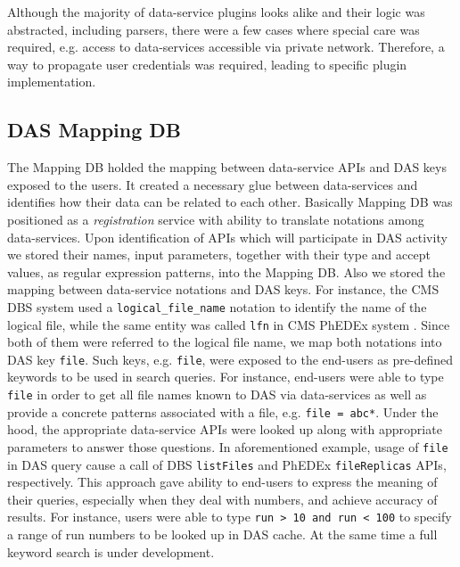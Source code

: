 \documentclass[1p,times]{elsarticle}
\begin{document}
Although the majority of data-service plugins looks alike
and their logic was abstracted, including parsers, there were a few
cases where special care was required, e.g. access to data-services 
accessible via private network. Therefore, a way to propagate 
user credentials was required, leading to specific plugin implementation.


\subsection{DAS Mapping DB}
The Mapping DB holded the mapping between data-service APIs and DAS keys exposed to
the users. It created a necessary glue between data-services and identifies
how their data can be related to each other. Basically Mapping DB was positioned 
as a {\it registration} service with ability to translate notations among data-services.
Upon identification of APIs which will participate in DAS activity 
we stored their names, input parameters, together with their type and accept 
values, as regular expression patterns, into the Mapping DB. 
Also we stored the mapping between data-service notations and DAS keys. 
For instance, the CMS DBS system \cite{DBS}
used a \verb+logical_file_name+ notation to identify the name of the
logical file, while the same entity was called \verb+lfn+ 
in CMS PhEDEx system \cite{PhEDEx}.
Since both of them were referred to the logical file name, 
we map both notations into DAS key \verb+file+.
Such keys, e.g. \verb+file+, were exposed to the end-users as pre-defined keywords to
be used in search queries. For instance, end-users were able to type \verb+file+ in
order to get all file names known to DAS via data-services as well as
provide a concrete patterns associated with a file, e.g. \verb+file = abc*+.
Under the hood, the appropriate data-service APIs were looked up along with appropriate
parameters to answer those questions. In aforementioned example, 
usage of \verb+file+ in DAS query cause a call of DBS 
\verb+listFiles+ and PhEDEx \verb+fileReplicas+ APIs, respectively.
This approach gave ability to end-users to express the meaning of their queries, especially
when they deal with numbers, and achieve accuracy of results. 
For instance, users were able to type \verb+run > 10 and run < 100+
to specify a range of run numbers to be looked up in DAS cache. At the same time
a full keyword search is under development.
\end{document}

